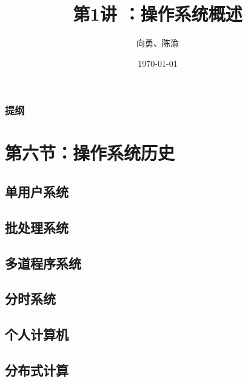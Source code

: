 \documentclass[UTF8]{ctexbeamer}
\title[第1讲]{第1讲 ：操作系统概述} %
\author{向勇、陈渝} %
\institute[清华大学] %
{
清华大学计算机系 \\ %
\medskip
\textit{xyong,yuchen@tsinghua.edu.cn} %
}
\date{\today} %
\begin{document}
\begin{frame}
\titlepage %
\end{frame}

\begin{frame}
\frametitle{提纲} %
\tableofcontents %
\end{frame}


\section{第六节：操作系统历史} %
\subsection{单用户系统}
\subsection{批处理系统}
\subsection{多道程序系统}
\subsection{分时系统}
\subsection{个人计算机}
\subsection{分布式计算}
\end{document}
